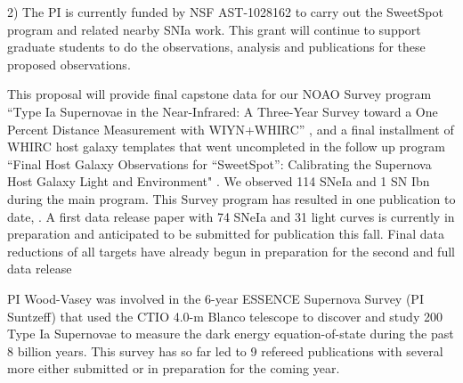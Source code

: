 \documentclass[11pt]{article}
\begin{document}
2) The PI is currently funded by NSF AST-1028162 to carry out the SweetSpot program and related nearby SNIa work.  This grant will continue to support graduate students to do the observations, analysis and publications for these proposed observations.  

%
%
%
%
%


%

\thepast

This proposal will provide final capstone data for our NOAO Survey 
program ``Type Ia Supernovae in the Near-Infrared: A Three-Year Survey toward a One Percent Distance Measurement with WIYN+WHIRC'' ,
and a final installment of WHIRC host galaxy templates that went uncompleted in the follow up program
``Final Host Galaxy Observations for ``SweetSpot'': Calibrating the Supernova Host Galaxy Light and Environment"
.
We observed 114 SNeIa and 1 SN Ibn during the main program.
This Survey program has resulted in one publication to date, \cite{weyant11}.  
A first data release paper with 74 SNeIa and 31 light curves is currently in preparation and anticipated to be submitted for publication this fall.
Final data reductions of all targets have already begun in preparation for the second and full data release

PI Wood-Vasey was involved in the 6-year ESSENCE Supernova Survey (PI Suntzeff) that used the CTIO 4.0-m Blanco telescope to discover and study 200 Type Ia Supernovae to measure the dark energy equation-of-state during the past 8 billion years.  This survey has so far led to 9 refereed publications with several more either submitted or in preparation for the coming year.
\end{document}
